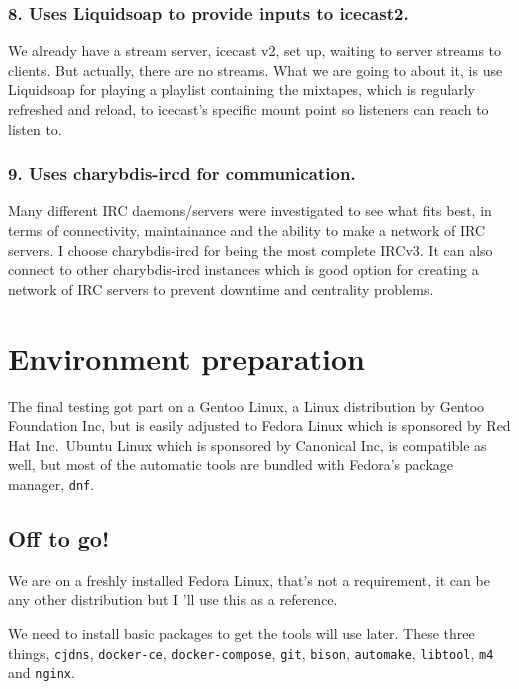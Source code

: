 \documentclass[12pt]{report}
\begin{document}
\subsubsection{8. Uses Liquidsoap to provide inputs to
icecast2.}\label{uses-liquidsoap-to-provide-inputs-to-icecast2.}

We already have a stream server, icecast v2, set up, waiting to server
streams to clients. But actually, there are no streams. What we are
going to about it, is use Liquidsoap for playing a playlist containing
the mixtapes, which is regularly refreshed and reload, to icecast's
specific mount point so listeners can reach to listen to.


\subsubsection{9. Uses charybdis-ircd for
communication.}\label{uses-charybdis-ircd-for-communication.}

Many different IRC daemons/servers were investigated to see what fits
best, in terms of connectivity, maintainance and the ability to make a
network of IRC servers. I choose charybdis-ircd for being the most
complete IRCv3. It can also connect to other charybdis-ircd instances
which is good option for creating a network of IRC servers to prevent
downtime and centrality problems.


\section{Environment preparation}\label{environment-preparation}

The final testing got part on a Gentoo Linux, a Linux distribution by
Gentoo Foundation Inc, but is easily adjusted to Fedora Linux which is
sponsored by Red Hat Inc.~Ubuntu Linux which is sponsored by Canonical
Inc, is compatible as well, but most of the automatic tools are bundled
with Fedora's package manager, \texttt{dnf}.


\subsection{Off to go!}\label{off-to-go}

We are on a freshly installed Fedora Linux, that's not a requirement, it
can be any other distribution but I 'll use this as a reference.

We need to install basic packages to get the tools will use later. These
three things, \texttt{cjdns}, \texttt{docker-ce},
\texttt{docker-compose}, \texttt{git}, \texttt{bison},
\texttt{automake}, \texttt{libtool}, \texttt{m4} and \texttt{nginx}.
\end{document}
